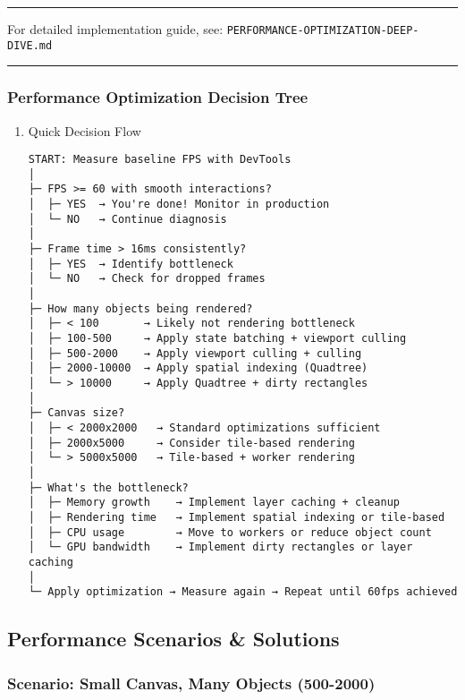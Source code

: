 \documentclass[11pt]{article}
\begin{document}
\begin{enumerate}
\begin{enumerate}
\noindent\rule{\textwidth}{0.5pt}

For detailed implementation guide, see: \texttt{PERFORMANCE-OPTIMIZATION-DEEP-DIVE.md}


\noindent\rule{\textwidth}{0.5pt}
\end{enumerate}
\end{enumerate}
\subsubsection{Performance Optimization Decision Tree}
\label{sec:org3f5255e}

\begin{enumerate}
\item Quick Decision Flow
\label{sec:orgc2e4ce3}

\begin{verbatim}
START: Measure baseline FPS with DevTools
│
├─ FPS >= 60 with smooth interactions?
│  ├─ YES  → You're done! Monitor in production
│  └─ NO   → Continue diagnosis
│
├─ Frame time > 16ms consistently?
│  ├─ YES  → Identify bottleneck
│  └─ NO   → Check for dropped frames
│
├─ How many objects being rendered?
│  ├─ < 100       → Likely not rendering bottleneck
│  ├─ 100-500     → Apply state batching + viewport culling
│  ├─ 500-2000    → Apply viewport culling + culling
│  ├─ 2000-10000  → Apply spatial indexing (Quadtree)
│  └─ > 10000     → Apply Quadtree + dirty rectangles
│
├─ Canvas size?
│  ├─ < 2000x2000   → Standard optimizations sufficient
│  ├─ 2000x5000     → Consider tile-based rendering
│  └─ > 5000x5000   → Tile-based + worker rendering
│
├─ What's the bottleneck?
│  ├─ Memory growth    → Implement layer caching + cleanup
│  ├─ Rendering time   → Implement spatial indexing or tile-based
│  ├─ CPU usage        → Move to workers or reduce object count
│  └─ GPU bandwidth    → Implement dirty rectangles or layer caching
│
└─ Apply optimization → Measure again → Repeat until 60fps achieved
\end{verbatim}
\end{enumerate}
\subsection{Performance Scenarios \& Solutions}
\label{sec:orgb6b2752}

\subsubsection{Scenario: Small Canvas, Many Objects (500-2000)}
\label{sec:org01aa12a}
\end{document}
